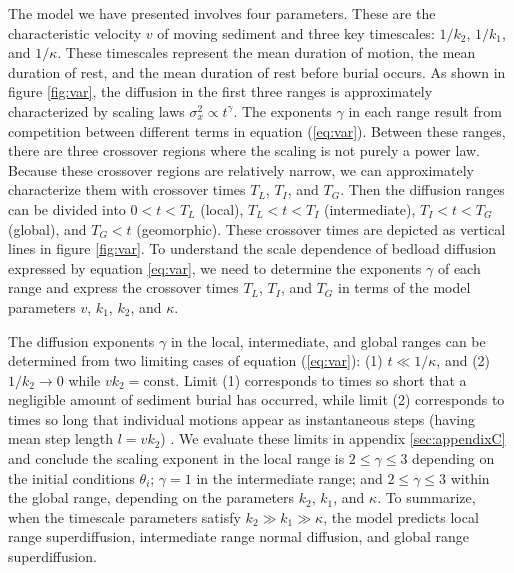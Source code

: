 \documentclass[]{agujournal2018}
\begin{document}
The model we have presented involves four parameters. These are the characteristic velocity $v$ of moving sediment and three key timescales: $1/k_2$, $1/k_1$, and $1/\kappa$.
These timescales represent the mean duration of motion, the mean duration of rest, and the mean duration of rest before burial occurs.
As shown in figure \ref{fig:var}, the diffusion in the first three ranges is approximately characterized by scaling laws $\sigma_x^2 \propto t^\gamma$.
The exponents $\gamma$ in each range result from competition between different terms in equation (\ref{eq:var}).
Between these ranges, there are three crossover regions where the scaling is not purely a power law.
Because these crossover regions are relatively narrow, we can approximately characterize them with crossover times $T_L$, $T_I$, and $T_G$.
Then the diffusion ranges can be divided into $0< t < T_L$ (local), $T_L < t < T_I$ (intermediate), $T_I < t < T_G$ (global), and $T_G < t$ (geomorphic).
These crossover times are depicted as vertical lines in figure \ref{fig:var}.
To understand the scale dependence of bedload diffusion expressed by equation \ref{eq:var}, we need to determine the exponents $\gamma$ of each range and express the crossover times $T_L$, $T_I$, and $T_G$ in terms of the model parameters $v$, $k_1$, $k_2$, and $\kappa$.

The diffusion exponents $\gamma$ in the local, intermediate, and global ranges can be determined from two limiting cases of equation (\ref{eq:var}): (1) $t\ll 1/\kappa$, and (2) $1/k_2 \rightarrow 0$ while $vk_2 = \text{const}$.
Limit (1) corresponds to times so short that a negligible amount of sediment burial has occurred, while limit (2) corresponds to times so long that individual motions  appear as instantaneous steps (having mean step length $l=vk_2$) \citep[cf.][]{Einstein1937}.
We evaluate these limits in appendix \ref{sec:appendixC} and conclude the scaling exponent in the local range is $2 \leq \gamma \leq 3$ depending on the initial conditions $\theta_i$; $\gamma=1$ in the intermediate range; and $2 \leq \gamma \leq 3$ within the global range, depending on the parameters $k_2$, $k_1$, and $\kappa$.
To summarize, when the timescale parameters satisfy $k_2\gg k_1 \gg \kappa$, the model predicts local range superdiffusion, intermediate range normal diffusion, and global range superdiffusion.
\end{document}
